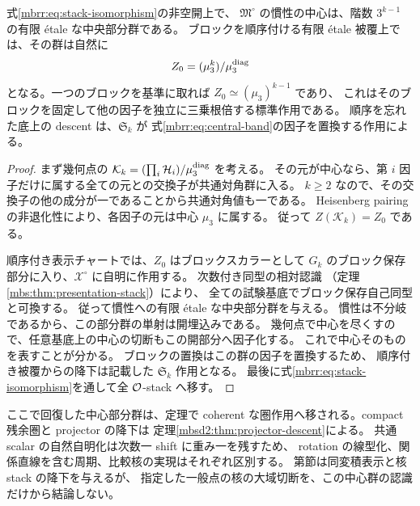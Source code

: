 \begin{corollary}[中心三乗根群の相対的な回復]
\label{mbrr:cor:central-band}
式\eqref{mbrr:eq:stack-isomorphism}の非空開上で、
$\mathfrak M^\circ$ の慣性の中心は、階数 $3^{k-1}$ の有限 \'etale な中央部分群である。
ブロックを順序付ける有限 \'etale 被覆上では、その群は自然に
\begin{equation}\label{mbrr:eq:central-band}
 Z_0=(\mu_3^k)/\mu_3^{\rm diag}
\end{equation}
となる。一つのブロックを基準に取れば $Z_0\simeq(\mu_3)^{k-1}$ であり、
これはそのブロックを固定して他の因子を独立に三乗根倍する標準作用である。
順序を忘れた底上の descent は、$\mathfrak S_k$ が
式\eqref{mbrr:eq:central-band}の因子を置換する作用による。
\end{corollary}
\begin{proof}
まず幾何点の
$\mathcal K_k=(\prod_i\mathcal H_i)/\mu_3^{\rm diag}$ を考える。
その元が中心なら、第 $i$ 因子だけに属する全ての元との交換子が共通対角群に入る。
$k\ge2$ なので、その交換子の他の成分が一であることから共通対角値も一である。
Heisenberg pairing の非退化性により、各因子の元は中心 $\mu_3$ に属する。
従って $Z(\mathcal K_k)=Z_0$ である。

順序付き表示チャートでは、$Z_0$ はブロックスカラーとして
$G_k$ のブロック保存部分に入り、$\mathcal X^\circ$ に自明に作用する。
次数付き同型の相対認識
（定理\ref{mbs:thm:presentation-stack}）により、
全ての試験基底でブロック保存自己同型と可換する。
従って慣性への有限 \'etale な中央部分群を与える。
慣性は不分岐であるから、この部分群の単射は開埋込みである。
幾何点で中心を尽くすので、任意基底上の中心の切断もこの開部分へ因子化する。
これで中心そのものを表すことが分かる。
ブロックの置換はこの群の因子を置換するため、
順序付き被覆からの降下は記載した $\mathfrak S_k$ 作用となる。
最後に式\eqref{mbrr:eq:stack-isomorphism}を通して全 $\mathcal O$-stack へ移す。
\end{proof}

ここで回復した中心部分群は、定理で
coherent な圏作用へ移される。compact 残余圏と projector の降下は
定理\ref{mbsd2:thm:projector-descent}による。
共通 scalar の自然自明化は次数一 shift に重み一を残すため、
rotation の線型化、関係直線を含む周期、比較核の実現はそれぞれ区別する。
第節は同変積表示と核 stack の降下を与えるが、
指定した一般点の核の大域切断を、この中心群の認識だけから結論しない。
